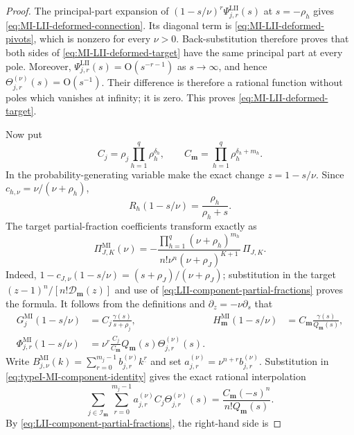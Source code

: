 \documentclass[10pt]{amsart}
\newcommand{\mm}{\boldsymbol m}
\newcommand{\fall}[2]{#1^{\underline{#2}}}
\theoremstyle{plain}
\theoremstyle{definition}
\theoremstyle{remark}
\begin{document}
\begin{proof}
The principal-part expansion of
\((1-s/\nu)^r\Psi_{j,r}^{\mathrm{LII}}(s)\) at
\(s=-\rho_h\) gives \eqref{eq:MI-LII-deformed-connection}.
Its diagonal term is \eqref{eq:MI-LII-deformed-pivots}, which is nonzero
for every \(\nu>0\). Back-substitution therefore proves
that both sides of \eqref{eq:MI-LII-deformed-target} have the same
principal part at every pole. Moreover,
\(\Psi_{j,r}^{\mathrm{LII}}(s)=\mathrm O(s^{-r-1})\) as
\(s\to\infty\), and hence
\(\Theta_{j,r}^{(\nu)}(s)=\mathrm O(s^{-1})\). Their difference is
therefore a rational function without poles which vanishes at infinity;
it is zero. This proves \eqref{eq:MI-LII-deformed-target}.

Now put
\[
 C_j=\rho_j\prod_{h=1}^q\rho_h^{\delta_h},\qquad
 C_{\mm}=\prod_{h=1}^q\rho_h^{\delta_h+m_h}.
\]
In the probability-generating variable make the exact change
\(z=1-s/\nu\). Since \(c_{h,\nu}=\nu/(\nu+\rho_h)\),
\[
 R_h(1-s/\nu)=\frac{\rho_h}{\rho_h+s}.
\]
The target partial-fraction coefficients transform exactly as
\begin{equation}
 \Pi_{J,K}^{\mathrm{MI}}(\nu)
 =-\frac{\prod_{h=1}^q(\nu+\rho_h)^{m_h}}
 {n!\nu^n(\nu+\rho_J)^{K+1}}\,\Pi_{J,K}.
 \label{eq:MI-LII-exact-target-coefficients}
\end{equation}
Indeed,
\(1-c_{J,\nu}(1-s/\nu)=(s+\rho_J)/(\nu+\rho_J)\);
substitution in the target
\((z-1)^n/[n!\mathcal D_{\boldsymbol m}(z)]\) and use of
\eqref{eq:LII-component-partial-fractions} proves the formula.
It follows from the definitions and \(\partial_z=-\nu\partial_s\) that
\begin{align}
 G_j^{\mathrm{MI}}(1-s/\nu)
 &=C_j\frac{\gamma(s)}{s+\rho_j},&
 H_{\mm}^{\mathrm{MI}}(1-s/\nu)
 &=C_{\mm}\frac{\gamma(s)}{Q_{\mm}(s)},\nonumber\\
 \Phi_{j,r}^{\mathrm{MI}}(1-s/\nu)
 &=\nu^r\frac{C_j}{C_{\mm}}Q_{\mm}(s)
 \Theta_{j,r}^{(\nu)}(s).
 \label{eq:MI-LII-exact-basis-transform}
\end{align}
Write
\(B_{j,\nu}^{\mathrm{MI}}(k)
=\sum_{r=0}^{m_j-1}b_{j,r}^{(\nu)}\fall{k}{r}\) and set
\(a_{j,r}^{(\nu)}=\nu^{n+r}b_{j,r}^{(\nu)}\).
Substitution in \eqref{eq:typeI-MI-component-identity} gives the exact
rational interpolation
\begin{equation}
 \sum_{j\in\mathcal I_{\mm}}\sum_{r=0}^{m_j-1}
 a_{j,r}^{(\nu)}C_j\Theta_{j,r}^{(\nu)}(s)
 =\frac{C_{\mm}(-s)^n}{n!Q_{\mm}(s)}.
 \label{eq:MI-LII-exact-rational-interpolation}
\end{equation}
By \eqref{eq:LII-component-partial-fractions}, the right-hand side is

\end{proof}
\end{document}
